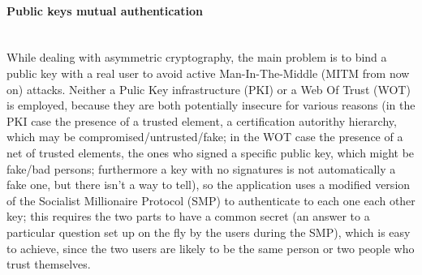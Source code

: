 \paragraph{Public keys mutual authentication} \hspace{0pt} \\
\small{While dealing with asymmetric cryptography, the main problem is to bind a public key with a real user to avoid active Man-In-The-Middle (MITM from now on) attacks. Neither a Pulic Key infrastructure (PKI) or a Web Of Trust (WOT) is employed, because they are both potentially insecure for various reasons (in the PKI case the presence of a trusted element, a certification autorithy hierarchy, which may be compromised/untrusted/fake; in the WOT case the presence of a net of trusted elements, the ones who signed a specific public key, which might be fake/bad persons; furthermore a key with no signatures is not automatically a fake one, but there isn't a way to tell), so the application uses a modified version of the Socialist Millionaire Protocol (SMP) to authenticate to each one each other key; this requires the two parts to have a common secret (an answer to a particular question set up on the fly by the users during the SMP), which is easy to achieve, since the two users are likely to be the same person or two people who trust themselves.}